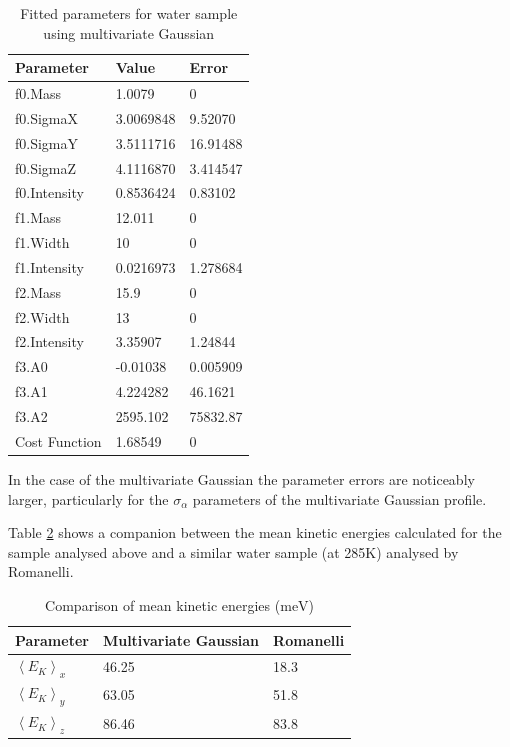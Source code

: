 \documentclass[a4paper]{article}
\begin{document}
\begin{table}[h!]
  \centering
  \begin{tabular}{lll}
    \toprule
    Parameter     & Value     & Error     \\
    \midrule
    f0.Mass       & 1.0079    & 0         \\
    f0.SigmaX     & 3.0069848 & 9.52070   \\
    f0.SigmaY     & 3.5111716 & 16.91488  \\
    f0.SigmaZ     & 4.1116870 & 3.414547  \\
    f0.Intensity  & 0.8536424 & 0.83102   \\
    f1.Mass       & 12.011    & 0         \\
    f1.Width      & 10        & 0         \\
    f1.Intensity  & 0.0216973 & 1.278684  \\
    f2.Mass       & 15.9      & 0         \\
    f2.Width      & 13        & 0         \\
    f2.Intensity  & 3.35907   & 1.24844   \\
    f3.A0         & -0.01038  & 0.005909  \\
    f3.A1         & 4.224282  & 46.1621   \\
    f3.A2         & 2595.102  & 75832.87  \\
    Cost Function & 1.68549   & 0         \\
    \bottomrule
  \end{tabular}
  \caption{Fitted parameters for water sample using multivariate Gaussian}
  \label{tab:mvg_water_params}
\end{table}
\FloatBarrier

In the case of the multivariate Gaussian the parameter errors are noticeably
larger, particularly for the $\sigma_{\alpha}$ parameters of the multivariate
Gaussian profile.

Table \ref{tab:mvg_ke_water} shows a companion between the mean kinetic energies
calculated for the sample analysed above and a similar water sample (at 285K)
analysed by Romanelli.

\begin{table}[h!]
  \centering
  \begin{tabular}{lll}
    \toprule
    Parameter                 & Multivariate Gaussian & Romanelli \cite{Romanelli2015} \\
    \midrule
    $\left<E_{K}\right>_{x}$  & 46.25                 & 18.3                           \\
    $\left<E_{K}\right>_{y}$  & 63.05                 & 51.8                           \\
    $\left<E_{K}\right>_{z}$  & 86.46                 & 83.8                           \\
    \bottomrule
  \end{tabular}
  \caption{Comparison of mean kinetic energies ($\mathrm{meV}$)}
  \label{tab:mvg_ke_water}
\end{table}
\FloatBarrier
\end{document}
